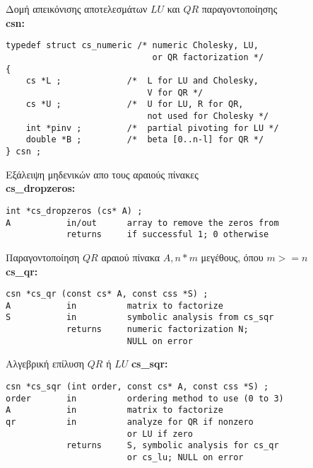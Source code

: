 Δομή απεικόνισης αποτελεσμάτων $LU$ και $QR$ παραγοντοποίησης\\
\textbf{csn:}
\begin{verbatim}
typedef struct cs_numeric /* numeric Cholesky, LU, 
                             or QR factorization */
{
    cs *L ;             /*  L for LU and Cholesky, 
                            V for QR */
    cs *U ;             /*  U for LU, R for QR, 
                            not used for Cholesky */
    int *pinv ;         /*  partial pivoting for LU */
    double *B ;         /*  beta [0..n-l] for QR */
} csn ;
\end{verbatim}


Εξάλειψη μηδενικών απο τους αραιούς πίνακες\\
\textbf{cs\_dropzeros:}
\begin{verbatim}
int *cs_dropzeros (cs* A) ;
A           in/out      array to remove the zeros from
            returns     if successful 1; 0 otherwise
\end{verbatim}

Παραγοντοποίηση $QR$ αραιού πίνακα $A, n * m$ μεγέθους, όπου $m >= n$\\
\textbf{cs\_qr:}
\begin{verbatim}
csn *cs_qr (const cs* A, const css *S) ;
A           in          matrix to factorize
S           in          symbolic analysis from cs_sqr
            returns     numeric factorization N;
                        NULL on error
\end{verbatim}


Αλγεβρική επίλυση $QR$ ή $LU$
\textbf{cs\_sqr:}
\begin{verbatim}
csn *cs_sqr (int order, const cs* A, const css *S) ;
order       in          ordering method to use (0 to 3)
A           in          matrix to factorize
qr          in          analyze for QR if nonzero 
                        or LU if zero
            returns     S, symbolic analysis for cs_qr 
                        or cs_lu; NULL on error
\end{verbatim}

